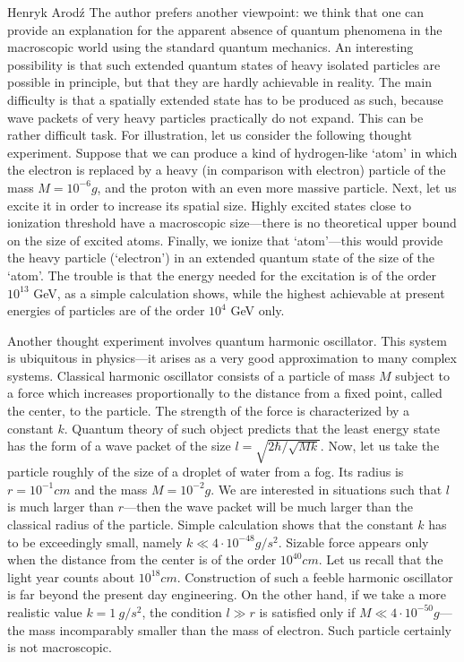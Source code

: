 \begin{artengenv}{Henryk Arod\'z}
The author prefers another viewpoint: we think that one can provide an explanation for the apparent absence of quantum phenomena in the macroscopic world using the standard quantum mechanics. An interesting possibility is that such extended quantum states of heavy isolated particles are possible in principle, but that they are hardly achievable in reality. The main difficulty is that a spatially extended state has to be produced as such, because wave packets of very heavy particles practically do not expand. This can be rather difficult task. For illustration, let us consider the following thought experiment. Suppose that we can produce a kind of hydrogen-like `atom' in which the electron is replaced by a heavy (in comparison with electron) particle of the mass $M= 10^{-6} g$, and the proton with an even more massive particle. Next, let us excite it in order to increase its spatial size. Highly excited states close to ionization threshold have a macroscopic size---there is no theoretical upper bound on the size of excited atoms. Finally, we ionize that `atom'---this would provide the heavy particle (`electron') in an extended quantum state of the size of the `atom'. The trouble is that the energy needed for the excitation is of the order $10^{13}$ GeV, as a simple calculation shows, while the highest achievable at present energies of particles are of the order $10^{4}$ GeV only.

Another thought experiment involves quantum harmonic oscillator. This system is ubiquitous in physics---it arises as a very good approximation to many complex systems. Classical harmonic oscillator consists of a particle of mass $M$ subject to a force which increases proportionally to the distance from a fixed point, called the center, to the particle. The strength of the force is characterized by a constant $k$. Quantum theory of such object predicts that the least energy state has the form of a wave packet of the size $l = \sqrt{2 \hbar/ \sqrt{M k}}$. Now, let us take the particle roughly of the size of a droplet of water from a fog. Its radius is $r= 10^{-1} cm$ and the mass $M= 10^{-2} g$. We are interested in situations such that $l$ is much larger than $r$---then the wave packet will be much larger than the classical radius of the particle. Simple calculation shows that the constant $k$ has to be exceedingly small, namely $k \ll 4\cdot 10^{-48} g/s^2$. Sizable force appears only when the distance from the center is of the order $10^{40} cm$. Let us recall that the light year counts about $10^{18} cm$. Construction of such a feeble harmonic oscillator is far beyond the present day engineering. On the other hand, if we take a more realistic value $k =1 \:g/s^2$, the condition $ l \gg r $ is satisfied only if $M \ll 4 \cdot 10^{-50} g$---the mass incomparably smaller than the mass of electron. Such particle certainly is not macroscopic. 






\end{artengenv}
